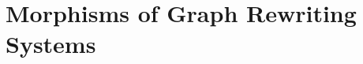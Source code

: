 \documentclass{book}
\begin{document}
    \section{Morphisms of Graph Rewriting Systems}
        \label{sec:morphisms_from_dpo_to_pbpop}
\end{document}
